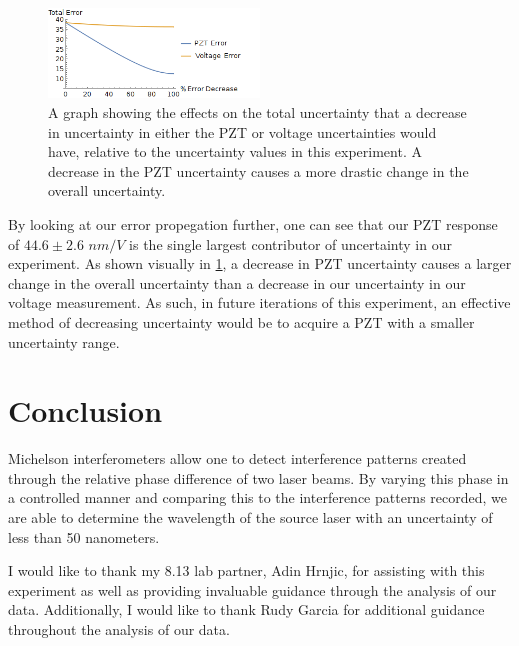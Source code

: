     \begin{figure}[h]
      \includegraphics[width=0.5\textwidth]{error.png}
      \caption{A graph showing the effects on the total uncertainty that a decrease in uncertainty in either the PZT or voltage uncertainties would have, relative to the uncertainty values in this experiment. A decrease in the PZT uncertainty causes a more drastic change in the overall uncertainty.}
      \label{fig:error}
    \end{figure}
    By looking at our error propegation further, one can see that our PZT response of $44.6 \pm 2.6$ $nm/V$ is the single largest contributor of uncertainty in our experiment. As shown visually in \ref{fig:error}, a decrease in PZT uncertainty causes a larger change in the overall uncertainty than a decrease in our uncertainty in our voltage measurement. As such, in future iterations of this experiment, an effective method of decreasing uncertainty would be to acquire a PZT with a smaller uncertainty range.
    \section{Conclusion}
    Michelson interferometers allow one to detect interference patterns created through the relative phase difference of two laser beams. By varying this phase in a controlled manner and comparing this to the interference patterns recorded, we are able to determine the wavelength of the source laser with an uncertainty of less than 50 nanometers. 
    \begin{acknowledgements}
    I would like to thank my 8.13 lab partner, Adin Hrnjic, for assisting with this experiment as well as providing invaluable guidance through the analysis of our data. Additionally, I would like to thank Rudy Garcia for additional guidance throughout the analysis of our data.
  \end{acknowledgements}

  


